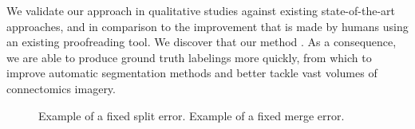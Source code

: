 We validate our approach in qualitative studies against existing state-of-the-art approaches, and in comparison to the improvement that is made by humans using an existing proofreading tool. We discover that our method . As a consequence, we are able to produce ground truth labelings more quickly, from which to improve automatic segmentation methods and better tackle vast volumes of connectomics imagery.

\begin{figure}
\caption{Example of a fixed split error. Example of a fixed merge error.}
\end{figure}